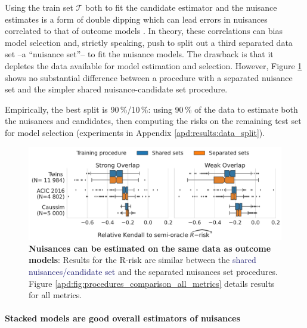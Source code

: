 \documentclass[a4paper,num-refs]{oup-contemporary}%
\begin{document}
Using the train set $\mathcal{T}$ both to fit the candidate estimator and the
nuisance estimates is a form of double dipping which can lead errors in
nuisances correlated to that of outcome models
\cite{nie_quasioracle_2017}. In theory, these correlations can bias model
selection and, strictly speaking, push
to split out a third separated data set --a ``nuisance set''-- to fit the
nuisance models. The drawback is that it depletes the data available for
model estimation and selection. However, Figure
\ref{fig:procedures_comparison} shows no substantial difference between a procedure with a separated
nuisance set and the simpler shared nuisance-candidate set procedure.

Empirically, the best split is 90\,\%/10\,\%:
using 90\,\% of the data
to estimate both the nuisances and candidates, then computing the risks on the
remaining test set for model selection (experiments in Appendix
\ref{apd:results:data_split}).

\begin{figure}[!tb]
    \centering\begin{minipage}{\linewidth}
        \includegraphics[width=\linewidth]{_3_procedure_r_risk_only_3datasets_twocols.pdf}
    \end{minipage}

    \caption{\textbf{Nuisances can be estimated on the same data as outcome
            models}: Results for the R-risk are similar between the
        \textcolor{MidnightBlue}{shared
            nuisances/candidate set} and
        the \textcolor{RedOrange}{separated nuisances set} procedures. Figure
        \ref{apd:fig:procedures_comparison_all_metrics} details results for all metrics.}\label{fig:procedures_comparison}
\end{figure}

\paragraph{Stacked models are good overall estimators of nuisances}
\end{document}
